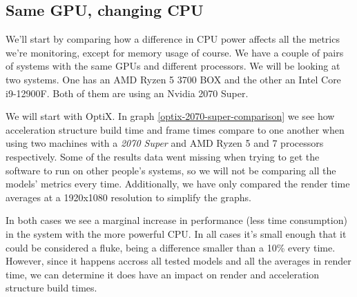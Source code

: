 \subsection{Same GPU, changing CPU}
We'll start by comparing how a difference in CPU power affects all the metrics we're monitoring, except for memory usage of course. We have a couple of pairs of systems with the same GPUs and different processors. We will be looking at two systems. One has an AMD Ryzen 5 3700 BOX and the other an Intel Core i9-12900F. Both of them are using an Nvidia 2070 Super. %

We will start with OptiX. In graph \ref{optix-2070-super-comparison} we see how acceleration structure build time and frame times compare to one another when using two machines with a \textit{2070 Super} and AMD Ryzen 5 and 7 processors respectively. Some of the results data went missing when trying to get the software to run on other people's systems, so we will not be comparing all the models' metrics every time. Additionally, we have only compared the render time averages at a 1920x1080 resolution to simplify the graphs.

In both cases we see a marginal increase in performance (less time consumption) in the system with the more powerful CPU. In all cases it's small enough that it could be considered a fluke, being a difference smaller than a 10\% every time. However, since it happens accross all tested models and all the averages in render time, we can determine it does have an impact on render and acceleration structure build times.

